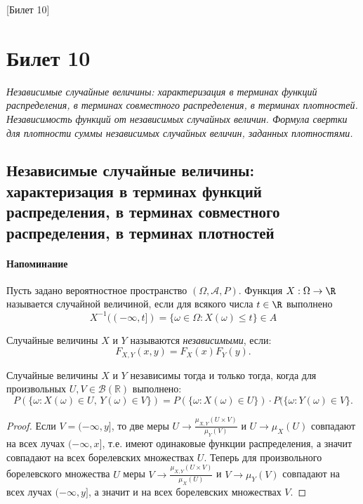 [Билет 10]

\section{Билет 10}

\begin{center}
    \it Независимые случайные величины: характеризация в терминах функций распределения, в терминах совместного распределения, в терминах плотностей.
    Независимость функций от независимых случайных величин.
    Формула свертки для плотности суммы независимых случайных величин, заданных плотностями.
\end{center}

\sectionbreak
\subsection{Независимые случайные величины: характеризация в терминах функций распределения, в терминах совместного распределения, в терминах плотностей}

\paragraph{Напоминание}
Пусть задано вероятностное пространство $(\Omega,\mathcal A, P)$.
Функция $X:\Omega\rightarrow\R$ называется случайной величиной, если для всякого числа $t\in\R$ выполнено
\[
    X^{-1}((-\infty, t]) = \{\omega\in\Omega: X(\omega)\le t\}\in{A}
\]

\begin{definition*}
    Случайные величины $X$ и $Y$ называются {\it независимыми}, если:
    \[
        F_{X, Y}(x, y) = F_X (x) F_Y(y).
    \]
\end{definition*}

\begin{proposal*}
    Случайные величины $X$ и $Y$ независимы тогда и только тогда, когда для произвольных $U, V\in \mathcal{B}(\mathbb{R})$ выполнено:
    \[
        P(\{\omega\colon X(\omega)\in U, \, Y(\omega)\in V\}) = P(\{\omega\colon X(\omega)\in U\})\cdot P(\{\omega\colon Y(\omega)\in V\}.
    \]
\end{proposal*}

\begin{proof}
    Если $V = (-\infty, y]$, то две меры $ U\to\frac{\mu_{X, Y}(U\times V)}{\mu_Y(V)}$ и $U\to\mu_X(U)$ совпадают на всех лучах $(-\infty, x]$, т.е. имеют одинаковые функции распределения, а значит совпадают на всех борелевских множествах $U$.
    Теперь для произвольного борелевского множества $U$ меры $V\to \frac{\mu_{X, Y}(U\times V)}{\mu_X(U)}$ и $V\to\mu_Y(V)$ совпадают на всех лучах $(-\infty, y]$, а значит и на всех борелевских множествах $V$.
\end{proof}

